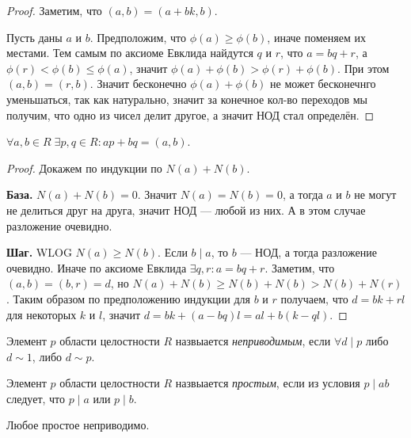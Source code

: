 \documentclass[12pt,a4paper]{article}
\begin{document}
    \begin{proof}
        Заметим, что $(a, b) = (a + bk, b)$.
        
        Пусть даны $a$ и $b$. Предположим, что $\phi(a) \geqslant \phi(b)$, иначе поменяем их местами. Тем самым по аксиоме Евклида найдутся $q$ и $r$, что $a = bq + r$, а $\phi(r) < \phi(b) \leqslant \phi(a)$, значит $\phi(a) + \phi(b) > \phi(r) + \phi(b)$. При этом $(a, b) = (r, b)$. Значит бесконечно $\phi(a) + \phi(b)$ не может бесконечнго уменьшаться, так как натурально, значит за конечное кол-во переходов мы получим, что одно из чисел делит другое, а значит НОД стал определён.
    \end{proof}

    \begin{theorem}
        $\forall a, b \in R\; \exists p, q \in R: ap + bq = (a, b)$.
    \end{theorem}

    \begin{proof}
        Докажем по индукции по $N(a) + N(b)$.

        \textbf{База.} $N(a) + N(b)=0$. Значит $N(a)=N(b)=0$, а тогда $a$ и $b$ не могут не делиться друг на друга, значит НОД --- любой из них. А в этом случае разложение очевидно.
        
        \textbf{Шаг.} WLOG $N(a) \geqslant N(b)$. Если $b \mid a$, то $b$ --- НОД, а тогда разложение очевидно. Иначе по аксиоме Евклида $\exists q, r: a = bq + r$. Заметим, что $(a, b) = (b, r) = d$, но $N(a) + N(b) \geqslant N(b) + N(b) > N(b) + N(r)$. Таким образом по предположению индукции для $b$ и $r$ получаем, что $d = bk + rl$ для некоторых $k$ и $l$, значит $d = bk + (a - bq)l = al + b(k - ql)$.
    \end{proof}

    \begin{definition}
        Элемент $p$ области целостности $R$ назвыается \emph{неприводимым}, если $\forall d \mid p$ либо $d \sim 1$, либо $d \sim p$.
    \end{definition}
    
    \begin{definition}
        Элемент $p$ области целостности $R$ назвыается \emph{простым}, если из условия $p \mid ab$ следует, что $p \mid a$ или $p \mid b$.
    \end{definition}

    \begin{statement}
        Любое простое неприводимо.
    \end{statement}
\end{document}
